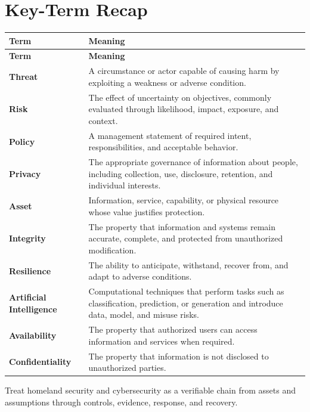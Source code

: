 \documentclass[11pt]{article}
\begin{document}
\section*{Key-Term Recap}
\begin{longtable}{>{\RaggedRight\arraybackslash}p{}>{\RaggedRight\arraybackslash}p{}}
\toprule\rowcolor{Navy}\color{white}\textbf{Term} & \color{white}\textbf{Meaning}\\\midrule
\endfirsthead
\toprule\rowcolor{Navy}\color{white}\textbf{Term} & \color{white}\textbf{Meaning}\\\midrule
\endhead
\textbf{Threat} & A circumstance or actor capable of causing harm by exploiting a weakness or adverse condition. \\\midrule
\textbf{Risk} & The effect of uncertainty on objectives, commonly evaluated through likelihood, impact, exposure, and context. \\\midrule
\textbf{Policy} & A management statement of required intent, responsibilities, and acceptable behavior. \\\midrule
\textbf{Privacy} & The appropriate governance of information about people, including collection, use, disclosure, retention, and individual interests. \\\midrule
\textbf{Asset} & Information, service, capability, or physical resource whose value justifies protection. \\\midrule
\textbf{Integrity} & The property that information and systems remain accurate, complete, and protected from unauthorized modification. \\\midrule
\textbf{Resilience} & The ability to anticipate, withstand, recover from, and adapt to adverse conditions. \\\midrule
\textbf{Artificial Intelligence} & Computational techniques that perform tasks such as classification, prediction, or generation and introduce data, model, and misuse risks. \\\midrule
\textbf{Availability} & The property that authorized users can access information and services when required. \\\midrule
\textbf{Confidentiality} & The property that information is not disclosed to unauthorized parties. \\\midrule
\bottomrule
\end{longtable}
\begin{takeawaybox}
Treat homeland security and cybersecurity as a verifiable chain from assets and assumptions through controls, evidence, response, and recovery.
\end{takeawaybox}
\end{document}
